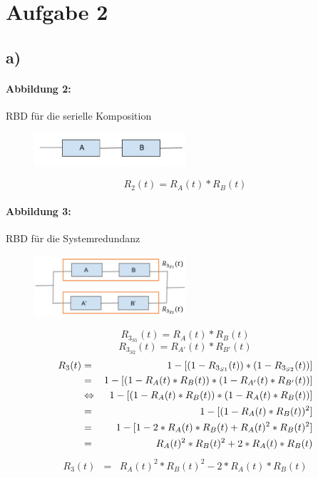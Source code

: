 \section*{Aufgabe 2}

\subsection*{a)}

	\paragraph{Abbildung 2:}
		RBD für die serielle Komposition
		\begin{figure}[h]
			\centering
			\includegraphics[width=0.5\textwidth]{../2/abbildung_2.png}
		\end{figure}
		\begin{equation}
			R_2(t) = R_A(t) * R_B(t)
		\end{equation}
	
	\paragraph{Abbildung 3:}
		RBD für die Systemredundanz
		\begin{figure}[h]
			\centering
			\includegraphics[width=0.5\textwidth]{../2/abbildung_3.png}
		\end{figure}
		\begin{equation}
			R_{3_{S1}}(t) = R_A(t) * R_B(t)
		\end{equation}
		\begin{equation}
			R_{3_{S2}}(t) = R_{A'}(t) * R_{B'}(t)
		\end{equation}
		\begin{eqnarray}
			R_3(t) &=&				1 - [ (1 - R_{3_{S1}}(t)) * (1 - R_{3_{S2}}(t)) ]
			\cr &=&					1 - [ (1 - R_A(t) * R_B(t)) * (1 - R_{A'}(t) * R_{B'}(t)) ]
			\cr &\Leftrightarrow&	1 - [ (1 - R_A(t) * R_B(t)) * (1 - R_A(t) * R_B(t)) ]
			\cr &=&					1 - [ (1 - R_A(t) * R_B(t))^2 ]
			\cr &=&					1 - [ 1 - 2*R_A(t)*R_B(t) + R_A(t)^2 * R_B(t)^2 ]
			\cr &=&					R_A(t)^2 * R_B(t)^2 + 2*R_A(t)*R_B(t)
		\end{eqnarray}
		\begin{eqnarray}
			R_3(t) &=& R_A(t)^2 * R_B(t)^2 - 2*R_A(t)*R_B(t)
		\end{eqnarray}
	
